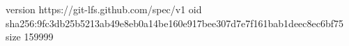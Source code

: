 version https://git-lfs.github.com/spec/v1
oid sha256:9fc3db25b5213ab49e8eb0a14be160e917bee307d7e7f161bab1deec8ec6bf75
size 159999
